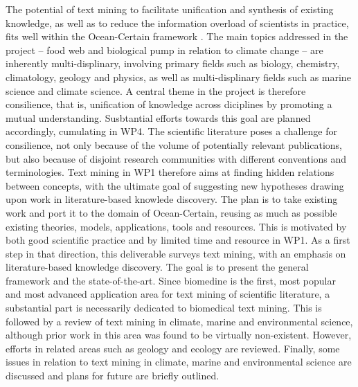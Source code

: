 The potential of text mining to facilitate unification and synthesis of existing knowledge, as well as to reduce the information overload of scientists in practice, fits well within the Ocean-Certain framework \citep{Olsen2013Ocean}.
The main topics addressed in the project -- food web and biological pump in relation to climate change -- are inherently multi-displinary, involving primary fields such as biology, chemistry, climatology, geology and physics, as well as  multi-displinary fields such as marine science and climate science.
A central theme in the project is therefore consilience, that is, unification of knowledge across diciplines by promoting a mutual understanding.
Susbtantial efforts towards this goal are planned accordingly, cumulating in WP4.
The scientific literature poses a challenge for consilience, not only because of the volume of potentially relevant publications, but also because of disjoint research communities with different conventions and terminologies.
Text mining in WP1 therefore aims at finding hidden relations between concepts, with the ultimate goal of suggesting new hypotheses drawing upon work in literature-based knowlede discovery.
The plan is to take existing work and port it to the domain of Ocean-Certain, reusing as much as possible existing theories, models, applications, tools and resources.
This is motivated by both good scientific practice and by limited time and resource in WP1.
As a first step in that direction, this deliverable surveys text mining, with an emphasis on literature-based knowledge discovery.
The goal is to present the general framework and the state-of-the-art.
Since biomedine is the first, most popular and most advanced application area for text mining of scientific literature, a substantial part is necessarily dedicated to biomedical text mining.
This is followed by a review of text mining in climate, marine and environmental science, although prior work in this area was found to be virtually non-existent. 
However, efforts in related areas such as geology and ecology are reviewed.
Finally, some issues in relation to text mining in climate, marine and environmental science are discussed and plans for future are briefly outlined.

